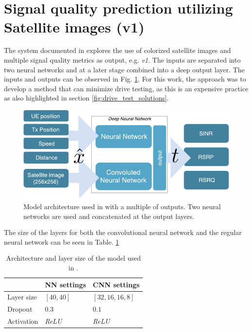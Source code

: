 \section{Signal quality prediction utilizing Satellite images (v1)}
The system documented in \cite{Thrane2018DriveApproximation} explores the use of colorized satellite images and multiple signal quality metrics as output, e.g. \emph{v1}. The inputs are separated into two neural networks and at a later stage combined into a deep output layer. The inputs and outputs can be observed in Fig. \ref{fig:dnn_architecture_drive_test_minimization}. For this work, the approach was to develop a method that can minimize drive testing, as this is an expensive practice as also highlighted in section \ref{fig:drive_test_solutions}.

\begin{figure}
    \centering
    \includegraphics{chapters/part_pathloss/drive_test_minimzation_paper/input_output_figure.pdf}
    \caption{Model architecture used in \cite{Thrane2018DriveApproximation} with a multiple of outputs. Two neural networks are used and concatenated at the output layers.}
    \label{fig:dnn_architecture_drive_test_minimization}
\end{figure}

The size of the layers for both the convolutional neural network and the regular neural network can be seen in Table. \ref{tab:dnn_architecture_drive_test_minimization}

\begin{table}[ht]
  \centering
  \caption{Architecture and layer size of the model used in \cite{Thrane2018DriveApproximation}.}
  \label{tab:dnn_architecture_drive_test_minimization}
  \begin{tabular}{l|l|l}
                & NN settings     & CNN settings      \\ \hline
  Layer size & $[40, 40]$      & $[32, 16, 16, 8]$ \\
  Dropout       & $0.3$           & $0.1$             \\
  Activation    & \textit{ReLU} & \textit{ReLU}  
\end{tabular}
\end{table}

